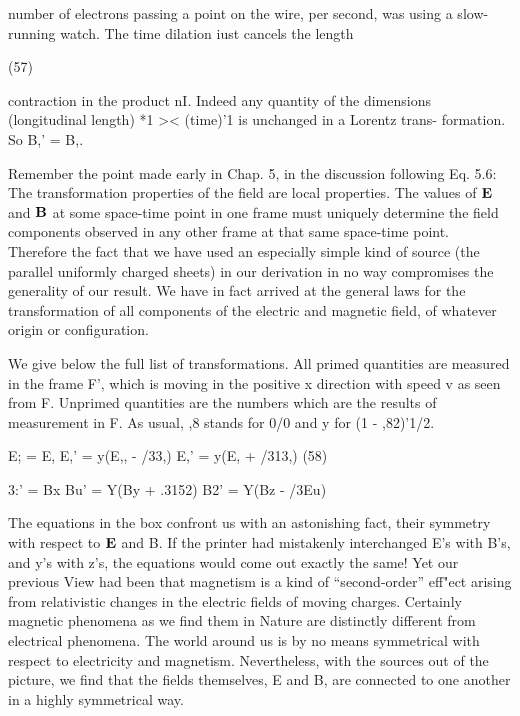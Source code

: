 number of electrons passing a point on the wire, per second, was
using a slow-running watch. The time dilation iust cancels the length

\begin{equation}
\end{equation}
(57)

contraction in the product nI. Indeed any quantity of the dimensions
(longitudinal length) *1 >< (time)'1 is unchanged in a Lorentz trans-
formation. So B,' = B,.

Remember the point made early in Chap. 5, in the discussion
following Eq. 5.6: The transformation properties of the field are local
properties. The values of $\mathbf{E}$ and $\mathbf{B}$ at some space-time point in one
frame must uniquely determine the field components observed in
any other frame at that same space-time point. Therefore the fact
that we have used an especially simple kind of source (the parallel
uniformly charged sheets) in our derivation in no way compromises
the generality of our result. We have in fact arrived at the general
laws for the transformation of all components of the electric and
magnetic field, of whatever origin or configuration.

We give below the full list of transformations. All primed
quantities are measured in the frame F', which is moving in the positive
x direction with speed v as seen from F. Unprimed quantities
are the numbers which are the results of measurement in F. As usual,
,8 stands for 0/0 and y for (1 - ,82)'1/2.

\begin{equation}
\end{equation}
E; = E, E,' = y(E,, - /33,) E,' = y(E, + /313,)
(58)

 

3:' = Bx Bu' = Y(By + .3152) B2' = Y(Bz - /3Eu)

The equations in the box confront us with an astonishing fact, their
symmetry with respect to $\mathbf{E}$ and B. If the printer had mistakenly
interchanged E's with B's, and y's with z's, the equations would come
out exactly the same! Yet our previous View had been that magnetism
is a kind of ``second-order'' eff"ect arising from relativistic
changes in the electric fields of moving charges. Certainly magnetic
phenomena as we find them in Nature are distinctly different from
electrical phenomena. The world around us is by no means symmetrical
with respect to electricity and magnetism. Nevertheless,
with the sources out of the picture, we find that the fields themselves,
E and B, are connected to one another in a highly symmetrical way.

